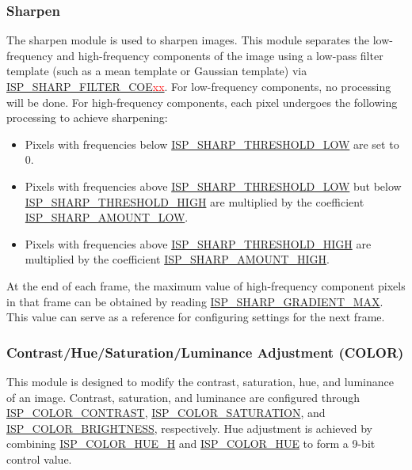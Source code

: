 \documentclass[main\_\_EN.tex]{subfiles}
\begin{document}
\subsubsection{Sharpen}
\label{sec:isp_sharpen}
The sharpen module is used to sharpen images. This module separates the low-frequency and high-frequency components of the image using a low-pass filter template (such as a mean template or Gaussian template) via \hyperref[fielddesc:ISPSHARPFILTERCOE00]{ISP\_SHARP\_FILTER\_COE\textcolor{red}{xx}}. For low-frequency components, no processing will be done. For high-frequency components, each pixel undergoes the following processing to achieve sharpening:
\begin{itemize}
    \item Pixels with frequencies below \hyperref[fielddesc:ISPSHARPTHRESHOLDLOW]{ISP\_SHARP\_THRESHOLD\_LOW} are set to 0.
    \item Pixels with frequencies above \hyperref[fielddesc:ISPSHARPTHRESHOLDLOW]{ISP\_SHARP\_THRESHOLD\_LOW} but below \hyperref[fielddesc:ISPSHARPTHRESHOLDHIGH]{ISP\_SHARP\_THRESHOLD\_HIGH} are multiplied by the coefficient \hyperref[fielddesc:ISPSHARPAMOUNTLOW]{ISP\_SHARP\_AMOUNT\_LOW}.
    \item Pixels with frequencies above \hyperref[fielddesc:ISPSHARPTHRESHOLDHIGH]{ISP\_SHARP\_THRESHOLD\_HIGH} are multiplied by the coefficient \hyperref[fielddesc:ISPSHARPAMOUNTHIGH]{ISP\_SHARP\_AMOUNT\_HIGH}.
\end{itemize}

At the end of each frame, the maximum value of high-frequency component pixels in that frame can be obtained by reading \hyperref[fielddesc:ISPSHARPGRADIENTMAX]{ISP\_SHARP\_GRADIENT\_MAX}. This value can serve as a reference for configuring settings for the next frame.


\subsubsection{Contrast/Hue/Saturation/Luminance Adjustment (COLOR)}

This module is designed to modify the contrast, saturation, hue, and luminance of an image. Contrast, saturation, and luminance are configured through \hyperref[fielddesc:ISPCOLORCONTRAST]{ISP\_COLOR\_CONTRAST}, \hyperref[fielddesc:ISPCOLORSATURATION]{ISP\_COLOR\_SATURATION}, and \hyperref[fielddesc:ISPCOLORBRIGHTNESS]{ISP\_COLOR\_BRIGHTNESS}, respectively. Hue adjustment is achieved by combining \hyperref[fielddesc:ISPCOLORHUEH]{ISP\_COLOR\_HUE\_H} and \hyperref[fielddesc:ISPCOLORHUE]{ISP\_COLOR\_HUE} to form a 9-bit control value.
\end{document}

